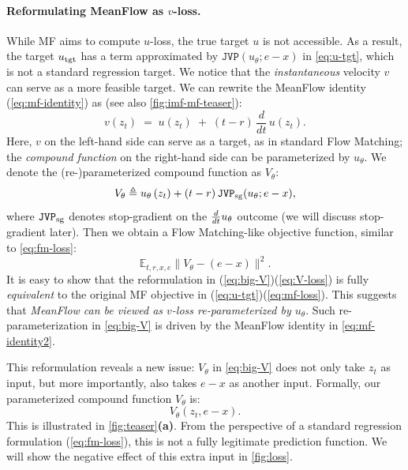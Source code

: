\paragraph{Reformulating MeanFlow as $v$-loss.}
While MF aims to compute $u$-loss, the true target $u$ is not accessible. As a result, the target $u_\text{tgt}$ has a term approximated by $\mathtt{JVP}(u_\theta; e-x)$ in \cref{eq:u-tgt}, which is not a standard regression target. 
We notice that the \textit{instantaneous} velocity $v$ can serve as a more feasible target. We can rewrite the MeanFlow identity (\ref{eq:mf-identity}) as (see also \cref{fig:imf-mf-teaser}):
\begin{equation}
v(z_t) \;=\; u(z_t)\;+\;(t-r)\,\frac{d}{dt}\,u(z_t).
\label{eq:mf-identity2}
\end{equation}
Here, $v$ on the left-hand side can serve as a target, as in standard Flow Matching; the \textit{compound function} on the right-hand side can be parameterized by $u_\theta$. We denote the \mbox{(re-)parameterized} compound function as $V_\theta$:
\begin{equation}
    V_\theta
    \triangleq u_\theta\,(z_t) + (t-r)\,\mathtt{JVP}_\textrm{sg}(u_\theta; e-x),
\label{eq:big-V}
\end{equation}
where $\mathtt{JVP}_\textrm{sg}$ denotes stop-gradient on the $\frac{d}{d t} u_\theta$ outcome (we will discuss stop-gradient later).
Then we obtain a Flow Matching-like objective function, similar to \cref{eq:fm-loss}:
\begin{equation}
    \label{eq:V-loss}
    \mathbb{E}_{t,r,x,e}\|V_\theta - (e-x)\|^2.
\end{equation}
It is easy to show that the reformulation in (\ref{eq:big-V})(\ref{eq:V-loss}) is fully \textit{equivalent} to the original MF objective in (\ref{eq:u-tgt})(\ref{eq:mf-loss}).
This suggests that \textit{MeanFlow can be viewed as $v$-loss re-parameterized by $u_\theta$}. Such re-parameterization in \cref{eq:big-V} is driven by the MeanFlow identity in \cref{eq:mf-identity2}.

This reformulation reveals a new issue: $V_\theta$ in \cref{eq:big-V} does not only take $z_t$ as input, but more importantly, also takes $e - x$ as another input. Formally, our parameterized compound function $V_\theta$ is:
\begin{equation}
V_\theta(z_t, e - x).
\end{equation}
This is illustrated in \cref{fig:teaser}\textbf{(a)}.
From the perspective of a standard regression formulation (\eg \cref{eq:fm-loss}), this is not a fully legitimate prediction function. We will show the negative effect of this extra input in \cref{fig:loss}. 

